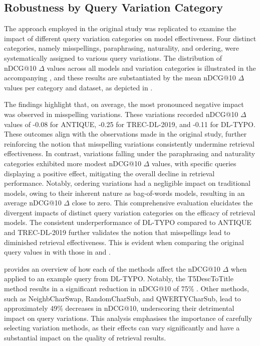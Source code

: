 \subsection{Robustness by Query Variation Category}
The approach employed in the original study was replicated to examine the impact of different query variation categories on model effectiveness. Four distinct categories, namely misspellings, paraphrasing, naturality, and ordering, were systematically assigned to various query variations. The distribution of nDCG@10 $\Delta$ values across all models and variation categories is illustrated in the accompanying , and these results are substantiated by the mean nDCG@10 $\Delta$ values per category and dataset, as depicted in .




The findings highlight that, on average, the most pronounced negative impact was observed in misspelling variations. These variations recorded nDCG@10 $\Delta$ values of -0.08 for ANTIQUE, -0.25 for TREC-DL-2019, and -0.11 for DL-TYPO. These outcomes align with the observations made in the original study, further reinforcing the notion that misspelling variations consistently undermine retrieval effectiveness. In contrast, variations falling under the paraphrasing and naturality categories exhibited more modest nDCG@10 $\Delta$ values, with specific queries displaying a positive effect, mitigating the overall decline in retrieval performance. Notably, ordering variations had a negligible impact on traditional models, owing to their inherent nature as bag-of-words models, resulting in an average nDCG@10 $\Delta$ close to zero. This comprehensive evaluation elucidates the divergent impacts of distinct query variation categories on the efficacy of retrieval models. The consistent underperformance of DL-TYPO compared to ANTIQUE and TREC-DL-2019 further validates the notion that misspellings lead to diminished retrieval effectiveness. This is evident when comparing the original query values in  with those in  and .

 provides an overview of how each of the methods affect the nDCG@10 $\Delta$ when applied to an example query from DL-TYPO. Notably, the T5DescToTitle method results in a significant reduction in nDCG@10 of 75\% . Other methods, such as NeighbCharSwap, RandomCharSub, and QWERTYCharSub, lead to approximately 49\% decreases in nDCG@10, underscoring their detrimental impact on query variations. This analysis emphasises the importance of carefully selecting variation methods, as their effects can vary significantly and have a substantial impact on the quality of retrieval results.

